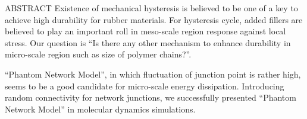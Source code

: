 \begin{itembox}[l]{ABSTRACT}
	Existence of mechanical hysteresis is believed to be one of a key to achieve high durability for rubber materials.
	For hysteresis cycle, added fillers are believed to play an important roll in meso-scale region response against local stress.
	Our question is ``Is there any other mechanism to enhance durability in micro-scale region such as size of polymer chains?''.

	``Phantom Network Model'', in which fluctuation of junction point is rather high, seems to be a good candidate for micro-scale energy dissipation.
	Introducing random connectivity for network junctions, we successfully presented ``Phantom Network Model'' in molecular dynamics simulations.
\end{itembox}